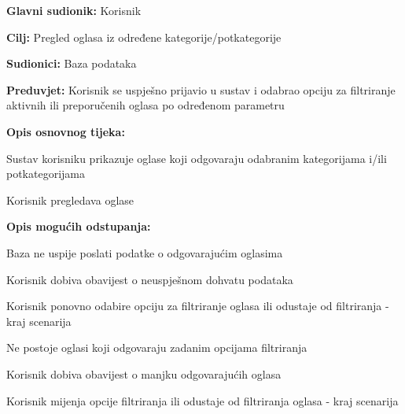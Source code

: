 					\noindent {}
					\begin{packed_item}
	
						\item \textbf{Glavni sudionik: }Korisnik
						\item  \textbf{Cilj:} Pregled oglasa iz određene kategorije/potkategorije
						\item  \textbf{Sudionici:} Baza podataka
						\item  \textbf{Preduvjet:} Korisnik se uspješno prijavio u sustav i odabrao opciju za filtriranje aktivnih ili preporučenih oglasa po određenom parametru
						\item  \textbf{Opis osnovnog tijeka:}
						
						\item[] \begin{packed_enum}
							\item Sustav korisniku prikazuje oglase koji odgovaraju odabranim kategorijama i/ili potkategorijama
							\item Korisnik pregledava oglase
						\end{packed_enum}
						\eject
						\item  \textbf{Opis mogućih odstupanja:}

						\item[] \begin{packed_item}
							\item[1.a] Baza ne uspije poslati podatke o odgovarajućim oglasima
							\item[] \begin{packed_enum}
								
								\item Korisnik dobiva obavijest o neuspješnom dohvatu podataka
								\item Korisnik ponovno odabire opciju za filtriranje oglasa ili odustaje od filtriranja - kraj scenarija
							
							\end{packed_enum}	

							\item[1.b] Ne postoje oglasi koji odgovaraju zadanim opcijama filtriranja
							\item[] \begin{packed_enum}
								
								\item Korisnik dobiva obavijest o manjku odgovarajućih oglasa
								\item Korisnik mijenja opcije filtriranja ili odustaje od filtriranja oglasa - kraj scenarija
							
							\end{packed_enum}	
						\end{packed_item}
					\end{packed_item}

